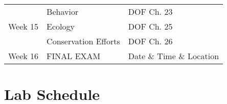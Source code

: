 \documentclass[letterpaper]{modular_syllabus} %
\begin{document}
\begin{center}
\begin{tabularx}{\textwidth}{p{2cm}p{8cm}p{9.5cm}}
    & Behavior & DOF Ch. 23 \\
    \arrayrulecolor{maingray}\hline
    Week 15 & Ecology & DOF Ch. 25 \\

    & Conservation Efforts & DOF Ch. 26 \\
    \arrayrulecolor{myCOLOR}\hline
    Week 16 & FINAL EXAM & Date \& Time \& Location \\
    \hline
  \end{tabularx}
\end{center}

\newpage
\section{Lab Schedule}
\end{document}
